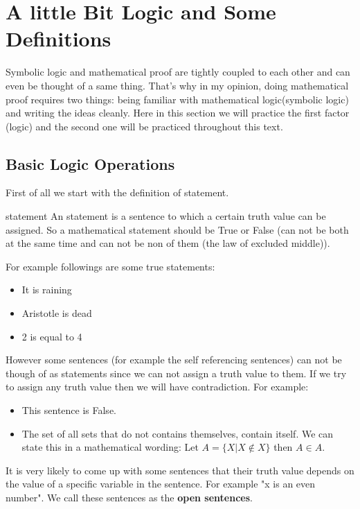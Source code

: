 \section{A little Bit Logic and Some Definitions}
Symbolic logic and mathematical proof are tightly coupled to each other and can even be thought of a same thing. That's why in my opinion, doing mathematical proof requires two things: being familiar with mathematical logic(symbolic logic) and writing the ideas cleanly. Here in this section we will practice the first factor (logic) and the second one will be practiced throughout this text.


\subsection{Basic Logic Operations}
First of all we start with the definition of statement.

\begin{defbox}{statement}
	An statement is a sentence to which a certain truth value can be assigned. So a mathematical statement should be True or False (can not be both at the same time and can not be non of them (the law of excluded middle)).
\end{defbox}

For example followings are some true statements:
\begin{itemize}
	\item It is raining
	\item Aristotle is dead
	\item 2 is equal to 4
\end{itemize}

However some sentences (for example the self referencing sentences) can not be though of as statements since we can not assign a truth value to them. If we try to assign any truth value then we will have contradiction. For example:

\begin{itemize}
	\item This sentence is False.
	\item The set of all sets that do not contains themselves, contain itself. We can state this in a mathematical wording: Let $ A = \{ X | X  \notin X \} $ then $ A \in A $.
\end{itemize}

It is very likely to come up with some sentences that their truth value depends on the value of a specific variable in the sentence. For example "x is an even number". We call these sentences as the \textbf{open sentences}. \\



